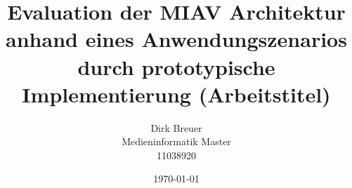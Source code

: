 \documentclass[12pt,headsepline,DIV12,BCOR12mm,a4paper,oneside,cleardoublestandard,openany,bibtotoc,liststotoc,halfparskip]{scrbook}
\begin{document}
\titlehead{
	{\large Fachhochschule Köln --- Campus Gummersbach\\
		\hfill }
	Steinmüllerallee~1\\
	51643 Gummersbach
	}
	\title{Evaluation der MIAV Architektur anhand eines Anwendungszenarios durch prototypische Implementierung (Arbeitstitel)}
	\author{Dirk Breuer\\Medieninformatik Master\\11038920}
	\publishers{
		\center
		\vspace{0.5cm}
		\large University of Applied Science of Cologne\\\textbf{Erstprüfer:} Prof. Dr. Mario Winter\\
		\large University of Applied Science of Cologne\\\textbf{Zweitprüfer:} Prof. Dr. Mario Winter\\
		\vspace{0.5cm}
    \large \href{mailto:dirk.breuer@gmail.com}{\emph{dirk.breuer@gmail.com}}
		}
	\date{\today}


\frontmatter

\newpage
% 
\newpage
% 

\mainmatter

% 
% 

% 
% 
% 
% 

\appendix

% 



% 

\end{document}
